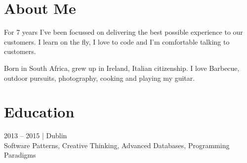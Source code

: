 \documentclass[letterpaper]{deedy-resume} %
\begin{document}




\begin{minipage}[t]{0.33\textwidth} %


\section{About Me}

For 7 years I've been focussed on delivering the best possible experience to our customers. I learn on the fly, I love to code and I'm comfortable talking to customers.

Born in South Africa, grew up in Ireland, Italian citizenship. I love Barbecue, outdoor pursuits, photography, cooking and playing my guitar. 

\sectionspace %


\section{Education} 

2013 – 2015 | Dublin\\
Software Patterns, Creative Thinking, Advanced Databases, Programming Paradigms\\

\sectionspace %


\end{minipage}
\end{document}
